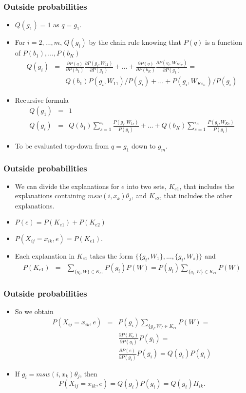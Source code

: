 \documentclass[trans,aspectratio=1610]{beamer}
\begin{document}
\begin{frame}
  \frametitle{Outside probabilities}
  \begin{itemize}
  \item $Q(g_1)=1$ as $q=g_1$. 
  \item For $i=2,\ldots,m$, 
$Q(g_i)$ by the chain rule knowing that $P(q)$ is a function 
of $P(b_1),\ldots,P(b_K)$
\begin{eqnarray*}
Q(g_i)&=&\frac{\partial P(q)}{\partial P(b_1)}\frac{\partial P(g_i,W_{11})}{\partial P(g_1)}+\ldots+
\frac{\partial P(q)}{\partial P(b_K)}\frac{\partial P(g_i,W_{Ki_K})}{\partial P(g_1)}=\\
&&Q(b_1)P(g_i,W_{11})/P(g_i)+\ldots+P(g_i,W_{Ki_K})/P(g_i)
\end{eqnarray*}
\item Recursive formula
\begin{eqnarray*}
Q(g_1)&=&1\\
Q(g_i)&=&Q(b_1)\sum_{s=1}^{i_1}\frac{P(g_i,W_{1s})}{P(g_i)}+\ldots+Q(b_K)\sum_{s=1}^{i_K}\frac{P(g_i,W_{Ks})}{P(g_i)}
\end{eqnarray*}
\item To be evaluated top-down from $q=g_1$ down to $g_m$. 
\end{itemize}
\end{frame}
\begin{frame}
  \frametitle{Outside probabilities}
  \begin{itemize}
\item We can divide the
explanations for $e$ into two sets, $K_{e1}$, that includes the explanations containing $msw(i,x_k)\theta_j$, and $K_{e2}$, that includes the other explanations.
\item   $P(e)=P(K_{e1})+ P(K_{e2})$
\item 
$P(X_{ij}=x_{ik},e)=P(K_{e1})$.
\item Each explanation in $K_{e1}$  takes the form
$\{\{g_i, W_{1}\}, \ldots,\{ g_i, W_{s}\}\}$ and
\begin{eqnarray}
P(K_{e1})&=&\sum_{\{g_i, W\} \in K_{e1}}P(g_i)P(W)=P(g_i)\sum_{\{g_i, W\} \in K_{e1}}P(W)
\end{eqnarray}
\end{itemize}
\end{frame}
\begin{frame}
  \frametitle{Outside probabilities}
  \begin{itemize}
  \item
So we obtain
\begin{eqnarray}
P(X_{ij}=x_{ik},e)&=&P(g_i)\sum_{\{g_i, W\} \in K_{e1}}P(W)=\nonumber\\
&&\frac{\partial P(K_{e})}{\partial P(g_i)}P(g_i)=\label{pen}\\
&&\frac{\partial P(e)}{\partial P(g_i)}P(g_i)=Q(g_i)P(g_i)\nonumber
\end{eqnarray}
  \item
If $g_i=msw(i,x_k)\theta_j$, then 
$$P(X_{ij}=x_{ik},e)=Q(g_i)P(g_i)=Q(g_i)\Pi_{ik}.$$
\end{itemize}
\end{frame}
\end{document}
